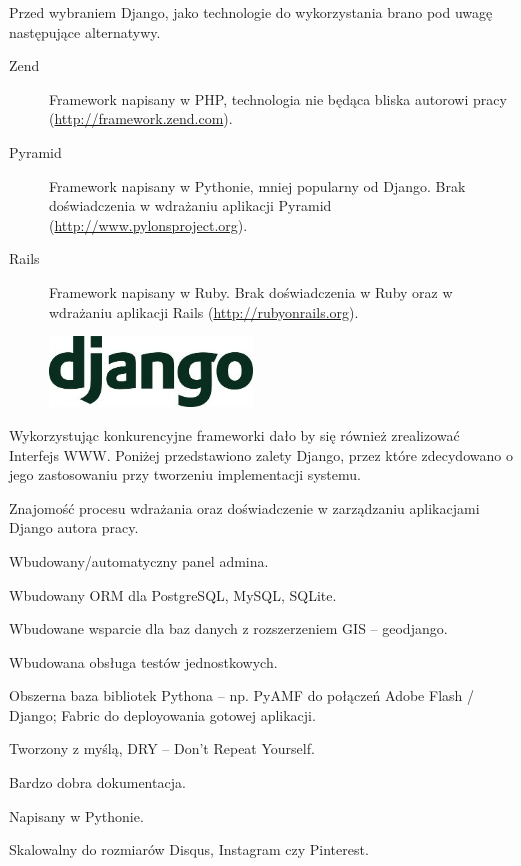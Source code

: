 Przed wybraniem Django, jako technologie do wykorzystania brano pod uwagę następujące alternatywy.
\begin{description}
    \item[Zend] Framework napisany w PHP, technologia nie będąca bliska autorowi pracy (\url{http://framework.zend.com}). 
    \item[Pyramid] Framework napisany w Pythonie, mniej popularny od Django. Brak doświadczenia w wdrażaniu aplikacji Pyramid (\url{http://www.pylonsproject.org}).
    \item[Rails] Framework napisany w Ruby. Brak doświadczenia w Ruby oraz w wdrażaniu aplikacji Rails (\url{http://rubyonrails.org}).
\end{description}

\begin{figure}
  \begin{center}
    \includegraphics[width=0.48\textwidth]{img/logos/django.jpg}
  \end{center}
\end{figure}

Wykorzystując konkurencyjne frameworki dało by się również zrealizować Interfejs WWW. Poniżej przedstawiono zalety Django, przez które zdecydowano o jego zastosowaniu przy tworzeniu implementacji systemu.
\begin{packed_item}
    \item{Znajomość procesu wdrażania oraz doświadczenie w zarządzaniu aplikacjami Django autora pracy.}
    \item{Wbudowany/automatyczny panel admina.}
    \item{Wbudowany ORM dla PostgreSQL, MySQL, SQLite.}
    \item{Wbudowane wsparcie dla baz danych z rozszerzeniem GIS -- geodjango.}
    \item{Wbudowana obsługa testów jednostkowych.}
    \item{Obszerna baza bibliotek Pythona -- np. PyAMF do połączeń Adobe Flash / Django; Fabric do deployowania gotowej aplikacji.}
    \item{Tworzony z myślą, DRY -- Don't Repeat Yourself.}
    \item{Bardzo dobra dokumentacja.}
    \item{Napisany w Pythonie.}
    \item{Skalowalny do rozmiarów Disqus, Instagram czy Pinterest.}
\end{packed_item}

